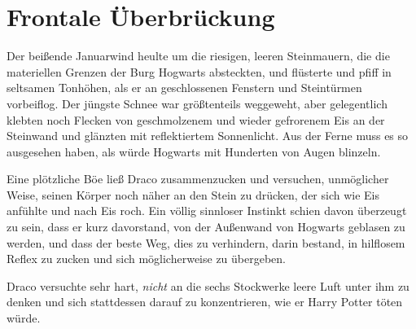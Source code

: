 \chapter{Frontale Überbrückung}

Der beißende Januarwind heulte um die riesigen, leeren Steinmauern, die die materiellen Grenzen der Burg Hogwarts absteckten, und flüsterte und pfiff in seltsamen Tonhöhen, als er an geschlossenen Fenstern und Steintürmen vorbeiflog. Der jüngste Schnee war größtenteils weggeweht, aber gelegentlich klebten noch Flecken von geschmolzenem und wieder gefrorenem Eis an der Steinwand und glänzten mit reflektiertem Sonnenlicht. Aus der Ferne muss es so ausgesehen haben, als würde Hogwarts mit Hunderten von Augen blinzeln.

Eine plötzliche Böe ließ Draco zusammenzucken und versuchen, unmöglicher Weise, seinen Körper noch näher an den Stein zu drücken, der sich wie Eis anfühlte und nach Eis roch. Ein völlig sinnloser Instinkt schien davon überzeugt zu sein, dass er kurz davorstand, von der Außenwand von Hogwarts geblasen zu werden, und dass der beste Weg, dies zu verhindern, darin bestand, in hilflosem Reflex zu zucken und sich möglicherweise zu übergeben.

Draco versuchte sehr hart, \emph{nicht} an die sechs Stockwerke leere Luft unter ihm zu denken und sich stattdessen darauf zu konzentrieren, wie er Harry Potter töten würde.


